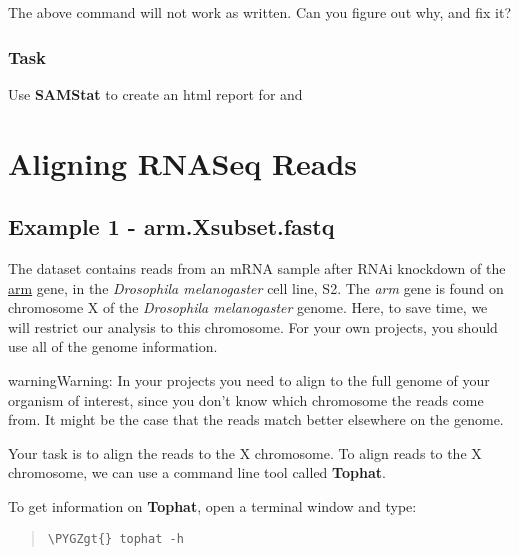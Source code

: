 \documentclass[a4paper,11pt,english]{sphinxmanual}
\def\PYGZgt{\char`\>}
\begin{document}
The above command will not work as written. Can you figure out why, and fix it?


\subsection{Task}
\label{exercises/STEP1_QualityControl:id1}
Use \textbf{SAMStat} to create an html report for  and 


\chapter{Aligning RNASeq Reads}
\label{exercises/STEP2_alignRNASeqReads:tophat}\label{exercises/STEP2_alignRNASeqReads::doc}\label{exercises/STEP2_alignRNASeqReads:aligning-rnaseq-reads}

\section{Example 1 - arm.Xsubset.fastq}
\label{exercises/STEP2_alignRNASeqReads:example-1-arm-xsubset-fastq}
The dataset  contains reads from an mRNA sample after RNAi knockdown of the \href{http://flybase.org/reports/FBgn0000117.html}{arm} gene, in the \emph{Drosophila melanogaster} cell line, S2. The \emph{arm} gene is found on chromosome X of the \emph{Drosophila melanogaster} genome. Here, to save time, we will restrict our analysis to this chromosome. For your own projects, you should use all of the genome information.

\begin{notice}{warning}{Warning:}
In your projects you need to align to the full genome of your organism of interest, since you don't know which chromosome the reads come from. It might be the case that the reads match better elsewhere on the genome.
\end{notice}

Your task is to align the reads to the X chromosome. To align reads to the X chromosome, we can use a command line tool called \textbf{Tophat}.

To get information on \textbf{Tophat}, open a terminal window and type:
\begin{quote}

\begin{Verbatim}[frame=single, rulecolor=\color{lightgray}, fontfamily=courier, commandchars=\\\{\}]
\PYGZgt{} tophat -h
\end{Verbatim}
\end{quote}
\end{document}
